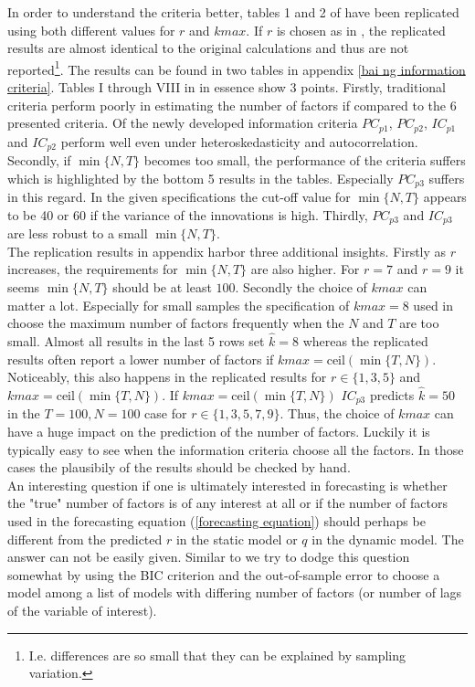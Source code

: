\documentclass[12pt]{article}
\begin{document}
In order to understand the criteria better, tables 1 and 2 of \citet{bai2002determining} have been replicated using both different values for $r$ and $kmax$. If $r$ is chosen as in \citet{bai2002determining}, the replicated results are almost identical to the original calculations and thus are not reported\footnote{I.e. differences are so small that they can be explained by sampling variation.}. The results can be found in two tables in appendix \ref{bai ng information criteria}. Tables I through VIII in \citet{bai2002determining} in essence show $3$ points. Firstly, traditional criteria perform poorly in estimating the number of factors if compared to the $6$ presented criteria. Of the newly developed information criteria $PC_{p1}$, $PC_{p2}$, $IC_{p1}$ and $IC_{p2}$ perform well even under heteroskedasticity and autocorrelation. Secondly, if $\min\{N, T\}$ becomes too small, the performance of the criteria suffers which is highlighted by the bottom 5 results in the tables. Especially $PC_{p3}$ suffers in this regard. In the given specifications the cut-off value for $\min\{N, T\}$ appears to be 40 or 60 if the variance of the innovations is high. Thirdly, $PC_{p3}$ and $IC_{p3}$ are less robust to a small $\min\{N, T\}$. \\
The replication results in appendix \citet{bai2002determining} harbor three additional insights. Firstly as $r$ increases, the requirements for $\min\{N, T\}$ are also higher. For $r=7$ and $r=9$ it seems $\min\{N, T\}$ should be at least $100$. Secondly the choice of $kmax$ can matter a lot. Especially for small samples the specification of $kmax=8$ used in \citet{bai2002determining} choose the maximum number of factors frequently when the $N$ and $T$ are too small. Almost all results in the last 5 rows set $\hat k=8$ whereas the replicated results often report a lower number of factors if $kmax=\text{ceil}(\min\{T, N\})$. Noticeably, this also happens in the replicated results for $r \in \{1, 3, 5\}$ and $kmax=\text{ceil}(\min\{T, N\})$. If $kmax=\text{ceil}(\min\{T, N\})$ $IC_{p3}$ predicts $\hat k=50$ in the $T=100, N=100$ case for $r \in \{1, 3, 5, 7, 9\}$. Thus, the choice of $kmax$ can have a huge impact on the prediction of the number of factors. Luckily it is typically easy to see when the information criteria choose all the factors. In those cases the plausibily of the results should be checked by hand. \\

An interesting question if one is ultimately interested in forecasting is whether the "true" number of factors is of any interest at all or if the number of factors used in the forecasting equation (\ref{forecasting equation}) should perhaps be different from the predicted $r$ in the static model or $q$ in the dynamic model. The answer can not be easily given. Similar to \citet{bai2008forecasting} we try to dodge this question somewhat by using the BIC criterion and the out-of-sample error to choose a model among a list of models with differing number of factors (or number of lags of the variable of interest).
\end{document}

